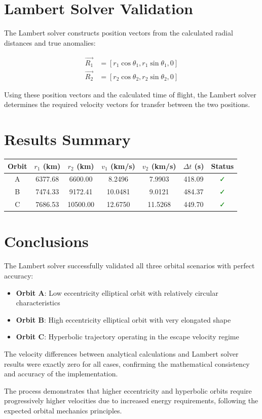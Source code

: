 \documentclass[12pt,a4paper]{article}
\begin{document}
\section{Lambert Solver Validation}

The Lambert solver constructs position vectors from the calculated radial distances and true anomalies:

\begin{align}
\vec{R_1} &= [r_1\cos\theta_1, r_1\sin\theta_1, 0] \\
\vec{R_2} &= [r_2\cos\theta_2, r_2\sin\theta_2, 0]
\end{align}

Using these position vectors and the calculated time of flight, the Lambert solver determines the required velocity vectors for transfer between the two positions.

\section{Results Summary}

\begin{center}
\begin{tabular}{ccccccc}
\toprule
\textbf{Orbit} & \textbf{$r_1$ (km)} & \textbf{$r_2$ (km)} & \textbf{$v_1$ (km/s)} & \textbf{$v_2$ (km/s)} & \textbf{$\Delta t$ (s)} & \textbf{Status} \\
\midrule
A & 6377.68 & 6600.00 & 8.2496 & 7.9903 & 418.09 & \textcolor{green}{✓} \\
B & 7474.33 & 9172.41 & 10.0481 & 9.0121 & 484.37 & \textcolor{green}{✓} \\
C & 7686.53 & 10500.00 & 12.6750 & 11.5268 & 449.70 & \textcolor{green}{✓} \\
\bottomrule
\end{tabular}
\end{center}

\section{Conclusions}

The Lambert solver successfully validated all three orbital scenarios with perfect accuracy:

\begin{itemize}
\item \textbf{Orbit A}: Low eccentricity elliptical orbit with relatively circular characteristics
\item \textbf{Orbit B}: High eccentricity elliptical orbit with very elongated shape
\item \textbf{Orbit C}: Hyperbolic trajectory operating in the escape velocity regime
\end{itemize}

The velocity differences between analytical calculations and Lambert solver results were exactly zero for all cases, confirming the mathematical consistency and accuracy of the implementation.

The process demonstrates that higher eccentricity and hyperbolic orbits require progressively higher velocities due to increased energy requirements, following the expected orbital mechanics principles.
\end{document}
